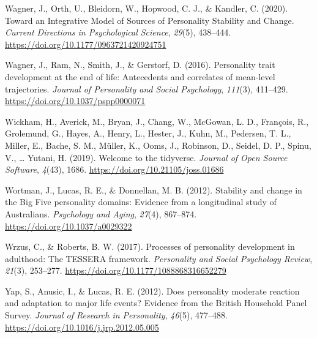 \documentclass[
  english,
  man, noextraspace]{apa7}
\begin{document}
\leavevmode\hypertarget{ref-wagnerIntegrativeModelSources2020}{}%
Wagner, J., Orth, U., Bleidorn, W., Hopwood, C. J., \& Kandler, C. (2020). Toward an Integrative Model of Sources of Personality Stability and Change. \emph{Current Directions in Psychological Science}, \emph{29}(5), 438--444. \url{https://doi.org/10.1177/0963721420924751}

\leavevmode\hypertarget{ref-wagnerPersonalityTraitDevelopment2016}{}%
Wagner, J., Ram, N., Smith, J., \& Gerstorf, D. (2016). Personality trait development at the end of life: Antecedents and correlates of mean-level trajectories. \emph{Journal of Personality and Social Psychology}, \emph{111}(3), 411--429. \url{https://doi.org/10.1037/pspp0000071}

\leavevmode\hypertarget{ref-tidyverse2019}{}%
Wickham, H., Averick, M., Bryan, J., Chang, W., McGowan, L. D., François, R., Grolemund, G., Hayes, A., Henry, L., Hester, J., Kuhn, M., Pedersen, T. L., Miller, E., Bache, S. M., Müller, K., Ooms, J., Robinson, D., Seidel, D. P., Spinu, V., \ldots{} Yutani, H. (2019). Welcome to the tidyverse. \emph{Journal of Open Source Software}, \emph{4}(43), 1686. \url{https://doi.org/10.21105/joss.01686}

\leavevmode\hypertarget{ref-wortmanStabilityChangeBig2012}{}%
Wortman, J., Lucas, R. E., \& Donnellan, M. B. (2012). Stability and change in the Big Five personality domains: Evidence from a longitudinal study of Australians. \emph{Psychology and Aging}, \emph{27}(4), 867--874. \url{https://doi.org/10.1037/a0029322}

\leavevmode\hypertarget{ref-wrzusProcessesPersonalityDevelopment2017}{}%
Wrzus, C., \& Roberts, B. W. (2017). Processes of personality development in adulthood: The TESSERA framework. \emph{Personality and Social Psychology Review}, \emph{21}(3), 253--277. \url{https://doi.org/10.1177/1088868316652279}

\leavevmode\hypertarget{ref-yapDoesPersonalityModerate2012}{}%
Yap, S., Anusic, I., \& Lucas, R. E. (2012). Does personality moderate reaction and adaptation to major life events? Evidence from the British Household Panel Survey. \emph{Journal of Research in Personality}, \emph{46}(5), 477--488. \url{https://doi.org/10.1016/j.jrp.2012.05.005}

\endgroup


\clearpage
\makeatletter
\efloat@restorefloats
\makeatother
\end{document}
